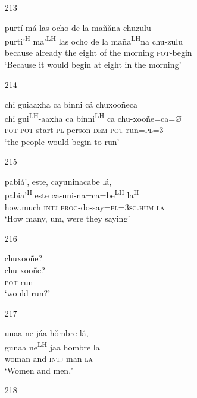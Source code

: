 \begin{itemize}
\item[213]
 
\glll   purt\'{i} m\'{a} las ocho de la ma\~{n}\v{a}na chuzulu \\
purti'\textsuperscript{H} ma'\textsuperscript{LH} las ocho de la ma\~{n}a\textsuperscript{LH}na chu-zulu \\
because already the eight of the morning \textsc{pot}-begin \\
\glt `Because it would begin at eight in the morning'
 


\item[214]
 
\glll   chi guiaaxha ca binni c\'{a} chuxoo\~{n}eca \\
chi gui\textsuperscript{LH}-aaxha ca binni\textsuperscript{LH} ca chu-xoo\~{n}e=ca=$\varnothing$ \\
\textsc{pot} \textsc{pot}-start \textsc{pl} person \textsc{dem} \textsc{pot}-run=\textsc{pl}=\textsc{3} \\
\glt `the people would begin to run'
 



\item[215]
 
\glll   pabi\'{a}', este, cayuninacabe l\'{a}, \\
pabia'\textsuperscript{H} este ca-uni-na=ca=be\textsuperscript{LH} la\textsuperscript{H} \\
how.much \textsc{intj} \textsc{prog}-do-say=\textsc{pl}=\textsc{3sg.hum} \textsc{la} \\
\glt `How many, um, were they saying'
 



\item[216]
 
\glll   chuxoo\~{n}e? \\
chu-xoo\~{n}e? \\
\textsc{pot}-run \\
\glt `would run?'
 


\item[217]
 
\glll   unaa ne j\'{a}a h\v{o}mbre l\'{a},  \\
gunaa ne\textsuperscript{LH} jaa hombre la  \\
woman and \textsc{intj} man \textsc{la} \\
\glt `Women and men,"
 


\item[218]
 

\end{itemize}
